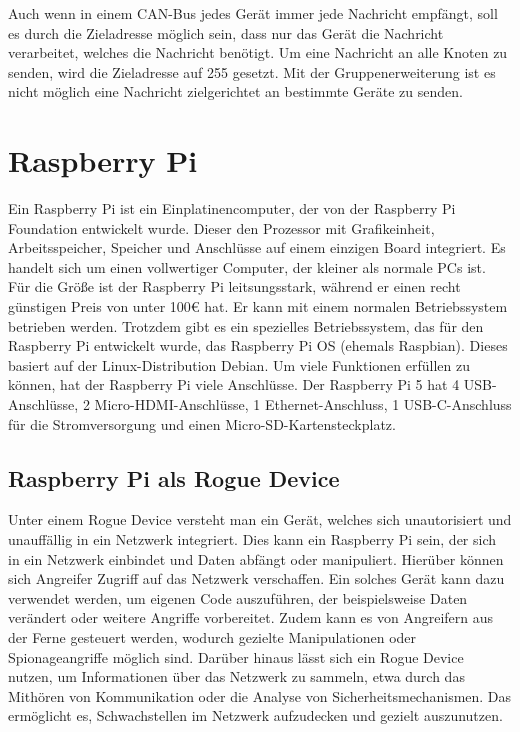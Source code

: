 Auch wenn in einem CAN-Bus jedes Gerät immer jede Nachricht empfängt, soll es durch die Zieladresse möglich sein,
dass nur das Gerät die Nachricht verarbeitet, welches die Nachricht benötigt. Um eine Nachricht an alle Knoten 
zu senden, wird die Zieladresse auf 255 gesetzt. Mit der Gruppenerweiterung ist es nicht möglich eine Nachricht 
zielgerichtet an bestimmte Geräte zu senden. \cite{Murvay2018}




\section{Raspberry Pi}
Ein Raspberry Pi ist ein Einplatinencomputer, der von der Raspberry Pi Foundation entwickelt wurde. 
Dieser den Prozessor mit Grafikeinheit, Arbeitsspeicher, Speicher und Anschlüsse auf einem einzigen Board integriert.
Es handelt sich um einen vollwertiger Computer, der kleiner als normale PCs ist. Für die Größe ist der Raspberry Pi
leitsungsstark, während er einen recht günstigen Preis von unter 100€ hat. Er kann mit einem normalen Betriebssystem
betrieben werden. Trotzdem gibt es ein spezielles Betriebssystem, das für den Raspberry Pi entwickelt wurde, das Raspberry Pi OS (ehemals Raspbian).
Dieses basiert auf der Linux-Distribution Debian. Um viele Funktionen erfüllen zu können, hat der Raspberry Pi viele Anschlüsse.
Der Raspberry Pi 5 hat 4 USB-Anschlüsse, 2 Micro-HDMI-Anschlüsse, 1 Ethernet-Anschluss, 1 USB-C-Anschluss für die Stromversorgung und einen Micro-SD-Kartensteckplatz.

\subsection{Raspberry Pi als Rogue Device}
Unter einem Rogue Device versteht man ein Gerät, welches sich unautorisiert und unauffällig in ein Netzwerk integriert. \cite{Scarfone2008}
Dies kann ein Raspberry Pi sein, der sich in ein Netzwerk einbindet und Daten abfängt oder manipuliert. Hierüber können 
sich Angreifer Zugriff auf das Netzwerk verschaffen. 
Ein solches Gerät kann dazu verwendet werden, um eigenen Code auszuführen, der beispielsweise Daten verändert oder 
weitere Angriffe vorbereitet. Zudem kann es von Angreifern aus der Ferne gesteuert werden, wodurch gezielte 
Manipulationen oder Spionageangriffe möglich sind. Darüber hinaus lässt sich ein Rogue Device nutzen, um Informationen 
über das Netzwerk zu sammeln, etwa durch das Mithören von Kommunikation oder die Analyse von Sicherheitsmechanismen.
Das ermöglicht es, Schwachstellen im Netzwerk aufzudecken und gezielt auszunutzen.

